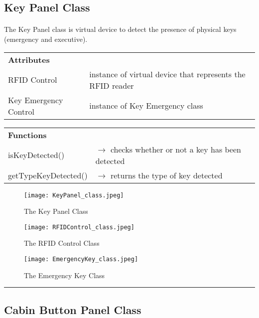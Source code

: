 \documentclass[12pt]{article}
\begin{document}
	\subsection*{Key Panel Class}
	\paragraph{} The Key Panel class is virtual device to detect the presence of physical keys (emergency and executive).
	\begin{table}[H]
		\begin{tabular}{lp{12cm}}
			\textbf{Attributes} & \\ 
			RFID Control           & instance of virtual device that represents the RFID reader \\
		   	Key Emergency Control  & instance of Key Emergency class\\
		\end{tabular}
	\end{table}     
	\begin{table}[H]
		\begin{tabular}{lp{12cm}}
			\textbf{Functions}      & \\
			isKeyDetected()         & $\rightarrow$ checks whether or not a key has been detected\\
			getTypeKeyDetected()    & $\rightarrow$ returns the type of key detected\\
		\end{tabular}
	\end{table}
    \begin{figure}[H]
  		\centerline{\texttt{[image: KeyPanel\_class.jpeg]}}
  		\caption{The Key Panel Class}
  		\label{fig:KeyPanel_class.}
	\end{figure}
    \begin{figure}[H]
  		\centerline{\texttt{[image: RFIDControl\_class.jpeg]}}
  		\caption{The RFID Control Class}
  		\label{fig:RFIDSensor_class}
	\end{figure}
    \begin{figure}[H]
  		\centerline{\texttt{[image: EmergencyKey\_class.jpeg]}}
  		\caption{The Emergency Key Class}
  		\label{fig:EmergencyKey_class}
	\end{figure}
	\par\noindent\rule{\textwidth}{0.4pt}
	
	\subsection*{Cabin Button Panel Class}
\end{document}
